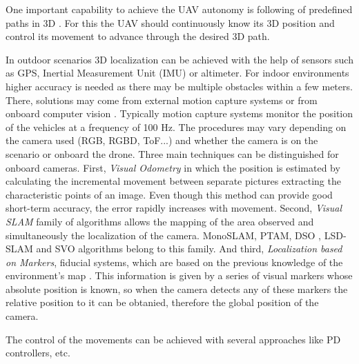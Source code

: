 \documentclass{styles/svproc}
\begin{document}
        
        One important capability to achieve the UAV autonomy is following of predefined paths in 3D \cite{dandrea2015,beul2015, nguyen2014}. For this the UAV should continuously know its 3D position and control its movement to advance through the desired 3D path.

        In outdoor scenarios 3D localization can be achieved with the help of sensors such as GPS, Inertial Measurement Unit (IMU) or altimeter. For indoor environments higher accuracy is needed as there may be multiple obstacles within a few meters. There, solutions may come from external motion capture systems \cite{jimenez2014,lupashin2014} or from onboard computer vision \cite{wu2013,rodriguezramos2016}. Typically motion capture systems monitor the position of the vehicles at a frequency of 100 Hz. The procedures may vary depending on the camera used (RGB, RGBD, ToF...) and whether the camera is on the scenario or onboard the drone. Three main techniques can be distinguished for onboard cameras. First, \textit{Visual Odometry} in which the position is estimated by calculating the incremental movement between separate pictures extracting the characteristic points of an image. Even though this method can provide good short-term accuracy, the error rapidly increases with movement. Second, \textit{Visual SLAM} family of algorithms allows the mapping of the area observed and simultaneously the localization of the camera. MonoSLAM, PTAM, DSO \cite{engel2017}, LSD-SLAM and SVO \cite{forster2014} algorithms belong to this family. And third, \textit{Localization based on Markers}, fiducial systems, which are based on the previous knowledge of the environment's map \cite{apvrille2013,lopezceron2016}. This information is given by a series of visual markers whose absolute position is known, so when the camera detects any of these markers the relative position to it can be obtanied, therefore the global position of the camera. 
	
The control of the movements can be achieved with several approaches like PD controllers, etc. \cite{hernandez2014,hernandez2013,nguyen2014}
        
\end{document}
